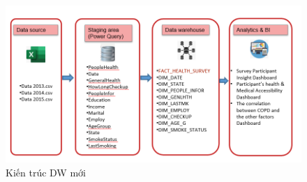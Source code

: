 \begin{enumerate}
\begin{itemize}
\end{itemize}\newpage
    \begin{center}
            \begin{figure}[!h]
                \centering
                \includegraphics[scale = 0.8]{figures/Duyen/Kiến trúc mới.PNG}
              \caption{Kiến trúc DW mới}
            \end{figure}
\end{center}
\end{enumerate}

\newpage
